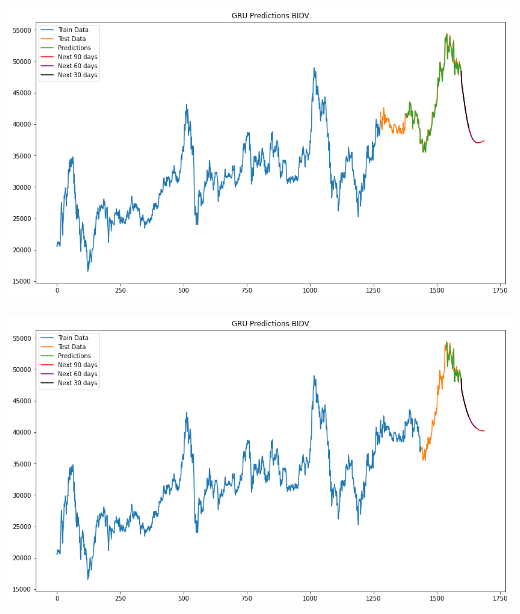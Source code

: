 \documentclass[conference]{IEEEtran}
\begin{document}
\begin{minipage}{0.21\textwidth}
    \centering
    \includegraphics[width=\linewidth]{images/GRU/GRU_BIDV_82.png}
    \label{fig:image1}
\end{minipage}
\hfill
\begin{minipage}{0.21\textwidth}
    \centering
    \includegraphics[width=\linewidth]{images/GRU/GRU_BIDV_91.png}
    \label{fig:image2}
\end{minipage}
\end{document}
